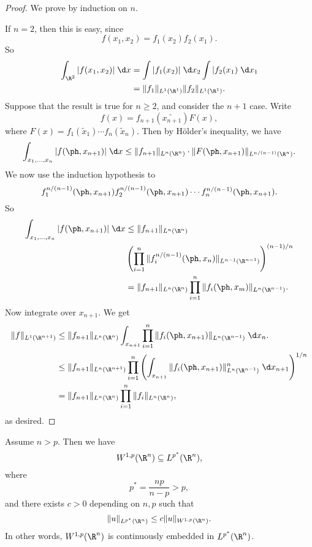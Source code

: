 \documentclass[a4paper]{article}
\begin{document}
\begin{proof}
  We prove by induction on $n$.

  If $n = 2$, then this is easy, since
  \[
    f(x_1, x_2) = f_1(x_2) f_2(x_1).
  \]
  So
  \begin{align*}
    \int_{\R^2}|f(x_1, x_2)| \;\d x &= \int |f_1(x_2)|\;\d x_2 \int |f_2(x_1)\;\d x_1\\
    &= \|f_1\|_{L^1(\R^1)} \|f_2\|_{L^1(\R^1)}.
  \end{align*}
  Suppose that the result is true for $n \geq 2$, and consider the $n + 1$ case. Write
  \[
    f(x) = f_{n + 1}(\tilde{x_{n + 1}}) F(x),
  \]
  where $F(x) = f_1(\tilde{x}_1) \cdots f_n(\tilde{x}_n)$. Then by H\"older's inequality, we have
  \begin{multline*}
    \int_{x_1, \ldots, x_n} |f(\ph, x_{n + 1})|\;\d x \leq \|f_{n + 1}\|_{L^n(\R^n)} \cdot \|F(\ph, x_{n + 1})\|_{L^{n/(n - 1)}(\R^n)}.
  \end{multline*}
  We now use the induction hypothesis to
  \[
    f_1^{n/(n - 1)} (\ph, x_{n + 1}) f_2^{n/(n - 1)}(\ph, x_{n + 1}) \cdots f_n^{n/(n - 1)}(\ph, x_{n + 1}).
  \]
  So
  \begin{align*}
    \int_{x_1, \ldots, x_n} |f(\ph, x_{n + 1})|\;\d x &\leq \|f_{n + 1}\|_{L^n(\R^n)}\\
    &\left(\prod_{i = 1}^n \|f_i^{n/(n-1)} (\ph, x_n)\|_{L^{n - 1}(\R^{n - 1})}\right)^{(n-1)/n}\\
    &= \|f_{n + 1}\|_{L^n(\R^n)} \prod_{i = 1}^n \|f_i(\ph, x_m)\|_{L^n(\R^{n - 1})}.
  \end{align*}
  Now integrate over $x_{n + 1}$. We get
  \begin{align*}
    \|f\|_{L^1(\R^{n + 1})} &\leq \|f_{n + 1}\|_{L^n(\R^n)} \int_{x_{n + 1}}\prod_{i = 1}^n \|f_i(\ph, x_{n + 1})\|_{L^n(\R^{n - 1})}\;\d x_n.\\
    &\leq \|f_{n + 1}\|_{L^n(\R^{n + 1})} \prod_{i = 1}^n \left(\int_{x_{n + 1}} \|f_i(\ph, x_{n + 1})\|^n_{L^n(\R^{n - 1})} \;\d x_{n + 1}\right)^{1/n}\\
    &= \|f_{n + 1}\|_{L^n(\R^n)} \prod_{i = 1}^n \|f_i\|_{L^n(\R^n)},
  \end{align*}
  as desired.
\end{proof}

\begin{thm}
  Assume $n > p$. Then we have
  \[
    W^{1, p}(\R^n) \subseteq L^{p^*}(\R^n),
  \]
  where
  \[
    p^* = \frac{np}{n - p} > p,
  \]
  and there exists $c > 0$ depending on $n, p$ such that
  \[
    \|u\|_{L^{p^*}(\R^n)} \leq c\|u\|_{W^{1, p}(\R^n)}.
  \]
  In other words, $W^{1, p}(\R^n)$ is continuously embedded in $L^{p^*}(\R^n)$.
\end{thm}
\end{document}
